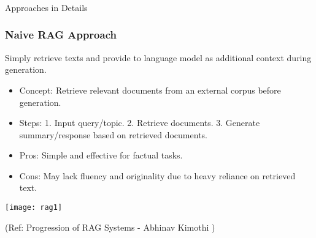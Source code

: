 \begin{frame}[fragile]\frametitle{}
\begin{center}
{\Large Approaches in Details}
\end{center}
\end{frame}

\begin{frame}[fragile]\frametitle{Naive RAG Approach}

Simply retrieve texts and provide to language model as additional context during generation.

\begin{itemize}
\item Concept: Retrieve relevant documents from an external corpus before generation.
\item Steps: 1. Input query/topic. 2. Retrieve documents. 3. Generate summary/response based on retrieved documents.
\item Pros: Simple and effective for factual tasks.
\item Cons: May lack fluency and originality due to heavy reliance on retrieved text.
\end{itemize}	

\begin{center}
\texttt{[image: rag1]}

{\tiny (Ref: Progression of RAG Systems - Abhinav Kimothi )}
\end{center}		

\end{frame}


